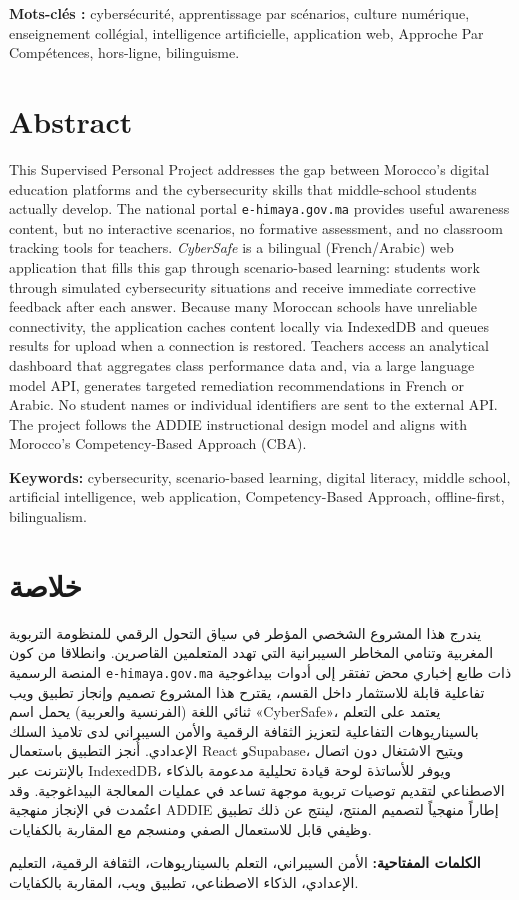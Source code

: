 \documentclass[12pt, a4paper, oneside]{report}
\begin{document}
\textbf{Mots-clés :} cybersécurité, apprentissage par scénarios, culture numérique, enseignement collégial, intelligence artificielle, application web, Approche Par Compétences, hors-ligne, bilinguisme.

\section*{Abstract}
This Supervised Personal Project addresses the gap between Morocco's digital education platforms and the cybersecurity skills that middle-school students actually develop. The national portal \texttt{e-himaya.gov.ma} provides useful awareness content, but no interactive scenarios, no formative assessment, and no classroom tracking tools for teachers. \textit{CyberSafe} is a bilingual (French/Arabic) web application that fills this gap through scenario-based learning: students work through simulated cybersecurity situations and receive immediate corrective feedback after each answer. Because many Moroccan schools have unreliable connectivity, the application caches content locally via IndexedDB and queues results for upload when a connection is restored. Teachers access an analytical dashboard that aggregates class performance data and, via a large language model API, generates targeted remediation recommendations in French or Arabic. No student names or individual identifiers are sent to the external API. The project follows the ADDIE instructional design model and aligns with Morocco's Competency-Based Approach (CBA).

\textbf{Keywords:} cybersecurity, scenario-based learning, digital literacy, middle school, artificial intelligence, web application, Competency-Based Approach, offline-first, bilingualism.

\section*{\textarabic{خلاصة}}
\begin{arabic}
يندرج هذا المشروع الشخصي المؤطر في سياق التحول الرقمي للمنظومة التربوية المغربية وتنامي المخاطر السيبرانية التي تهدد المتعلمين القاصرين. وانطلاقا من كون المنصة الرسمية \texttt{e-himaya.gov.ma} ذات طابع إخباري محض تفتقر إلى أدوات بيداغوجية تفاعلية قابلة للاستثمار داخل القسم، يقترح هذا المشروع تصميم وإنجاز تطبيق ويب ثنائي اللغة (الفرنسية والعربية) يحمل اسم «CyberSafe»، يعتمد على التعلم بالسيناريوهات التفاعلية لتعزيز الثقافة الرقمية والأمن السيبراني لدى تلاميذ السلك الإعدادي. أُنجز التطبيق باستعمال React وSupabase، ويتيح الاشتغال دون اتصال بالإنترنت عبر IndexedDB، ويوفر للأساتذة لوحة قيادة تحليلية مدعومة بالذكاء الاصطناعي لتقديم توصيات تربوية موجهة تساعد في عمليات المعالجة البيداغوجية. وقد اعتُمدت في الإنجاز منهجية ADDIE إطاراً منهجياً لتصميم المنتج، لينتج عن ذلك تطبيق وظيفي قابل للاستعمال الصفي ومنسجم مع المقاربة بالكفايات.

\textbf{الكلمات المفتاحية:} الأمن السيبراني، التعلم بالسيناريوهات، الثقافة الرقمية، التعليم الإعدادي، الذكاء الاصطناعي، تطبيق ويب، المقاربة بالكفايات.
\end{arabic}
\end{document}
